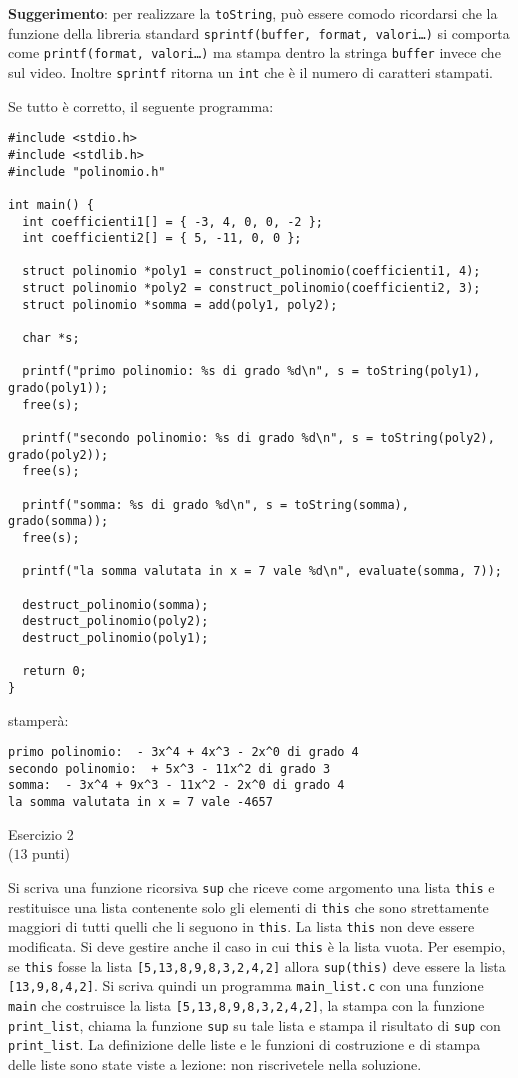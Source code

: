 \documentclass[italian,12pt]{article}
\begin{document}
\noindent\textbf{Suggerimento}: per realizzare la \texttt{toString}, pu\`o essere comodo ricordarsi che la
funzione della libreria standard \texttt{sprintf(buffer, format, valori\ldots)} si comporta come
\texttt{printf(format, valori\ldots)} ma stampa dentro la stringa \texttt{buffer} invece che sul video.
Inoltre \texttt{sprintf} ritorna un \texttt{int} che \`e il numero di caratteri stampati.

Se tutto \`e corretto, il seguente programma:
%
{\small
\begin{verbatim}
#include <stdio.h>
#include <stdlib.h>
#include "polinomio.h"

int main() {
  int coefficienti1[] = { -3, 4, 0, 0, -2 };
  int coefficienti2[] = { 5, -11, 0, 0 };

  struct polinomio *poly1 = construct_polinomio(coefficienti1, 4);
  struct polinomio *poly2 = construct_polinomio(coefficienti2, 3);
  struct polinomio *somma = add(poly1, poly2);

  char *s;

  printf("primo polinomio: %s di grado %d\n", s = toString(poly1), grado(poly1));
  free(s);

  printf("secondo polinomio: %s di grado %d\n", s = toString(poly2), grado(poly2));
  free(s);

  printf("somma: %s di grado %d\n", s = toString(somma), grado(somma));
  free(s);

  printf("la somma valutata in x = 7 vale %d\n", evaluate(somma, 7));

  destruct_polinomio(somma);
  destruct_polinomio(poly2);
  destruct_polinomio(poly1);

  return 0;
}
\end{verbatim}
}
%
\noindent stamper\`a:
%
{\small
\begin{verbatim}
primo polinomio:  - 3x^4 + 4x^3 - 2x^0 di grado 4
secondo polinomio:  + 5x^3 - 11x^2 di grado 3
somma:  - 3x^4 + 9x^3 - 11x^2 - 2x^0 di grado 4
la somma valutata in x = 7 vale -4657
\end{verbatim}
}
%
\vspace*{2ex}
\begin{center}{\Large Esercizio 2}\\
($13$ punti)\end{center}
%
Si scriva una funzione ricorsiva \texttt{sup} che riceve come argomento una lista
\texttt{this}
e restituisce una lista contenente solo gli elementi di
\texttt{this} che sono strettamente maggiori di tutti quelli che li seguono in \texttt{this}. La lista
\texttt{this} non deve essere modificata. Si deve gestire anche il caso
in cui \texttt{this} \`e la lista vuota. Per esempio,
se \texttt{this} fosse la lista \texttt{[5,13,8,9,8,3,2,4,2]} allora
\texttt{sup(this)} deve essere la lista \texttt{[13,9,8,4,2]}.
Si scriva quindi un programma
\texttt{main\_list.c} con una funzione \texttt{main} che costruisce la lista
\texttt{[5,13,8,9,8,3,2,4,2]}, la stampa con la funzione \texttt{print\_list},
chiama la funzione \texttt{sup} su tale lista e stampa il risultato
di \texttt{sup} con \texttt{print\_list}. La definizione delle liste e le funzioni
di costruzione e di stampa delle liste sono state viste a lezione: non riscrivetele
nella soluzione.
\end{document}
